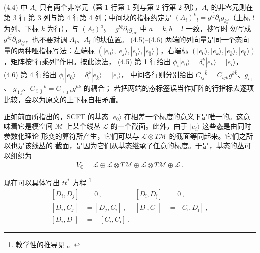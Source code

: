 \begin{yizhu}[易错点]
(4.4) 中 $A_i$ 只有两个非零元（第 1 行第 1 列与第 2 行第 2 列），$A_{\bar\imath}$ 的非零元则在第 3 行
第 3 列与第 4 行第 4 列；中间块的指标约定是 $(A_i)^k{}_l=g^{l\bar j}\partial_i g_{k\bar j}$（上标 $l$
为列、下标 $k$ 为行），与 $(A_i)^a{}_b=g^{b\bar c}\partial_i g_{a\bar c}$ 中 $a=k,b=l$ 一致，抄写时
勿写成 $g^{k\bar j}\partial_i g_{l\bar j}$，也不要对调 $A_i$、$A_{\bar\imath}$ 的块位置。
(4.5)--(4.6) 两端的列向量是同一个态向量的两种哑指标写法：左端标
$(|e_0\rangle,|e_j\rangle,|e_{\bar\jmath}\rangle,|e_{\bar 0}\rangle)$，右端标
$(|e_0\rangle,|e_k\rangle,|e_{\bar k}\rangle,|e_{\bar 0}\rangle)$，矩阵按“行乘列”作用。按此读法，
(4.5) 第 1 行给出 $\phi_i|e_0\rangle=\delta^k_i|e_k\rangle=|e_i\rangle$，(4.6) 第 4 行给出
$\phi_{\bar\imath}|e_{\bar 0}\rangle=\delta^{\bar k}_{\bar\imath}|e_{\bar k}\rangle=|e_{\bar\imath}\rangle$，
中间各行则分别给出 $C_{ij}{}^{\bar k}=C_{ijk}g^{k\bar k}$、$g_{i\bar\jmath}$、
$g_{\bar\imath j}$、$C_{\bar\imath\bar\jmath}{}^{k}=C_{\bar\imath\bar\jmath\bar k}g^{\bar k k}$ 的耦合；
若把两端的态标签误当作矩阵的行指标去逐项比较，会以为原文的上下标自相矛盾。
\end{yizhu}

正如前面所指出的，SCFT 的基态 $|e_0\rangle$ 在相差一个标度的意义下是唯一的。这意味着它是模空间
$\mathcal{M}$ 上某个线丛 $\mathcal{L}$ 的一个截面。此外，由于 $|e_i\rangle$ 这些态是由同时参数化理论
形变的算符所产生，它们可以与 $\mathcal{L}\otimes T\mathcal{M}$ 的截面等同起来。它们之所以也是该线丛的
截面，是因为它们从基态继承了任意的标度。于是，基态的丛可以组织为
\begin{equation}
  V_{\mathbb{C}}=\mathcal{L}\oplus\mathcal{L}\otimes T\mathcal{M}
  \oplus\overline{\mathcal{L}\otimes T\mathcal{M}}\oplus\overline{\mathcal{L}}\,.
  \tag{4.7}
  \label{eq:4.7}
\end{equation}

现在可以具体写出 $tt^*$ 方程 \cite{ref70}\footnote{教学性的推导见 \cite{ref9}。}
\begin{equation}
  \begin{aligned}
    [D_i,D_j]&=0\,, & [D_{\bar\imath},D_{\bar\jmath}]&=0\,,\\
    [D_i,C_j]&=[D_j,C_i]\,, & [D_{\bar\imath},C_{\bar\jmath}]&=[C_{\bar\imath},D_{\bar\jmath}]\,,\\
    [D_i,D_{\bar\imath}]&=-[C_i,C_{\bar\imath}]\,.
  \end{aligned}
  \tag{4.8}
  \label{eq:4.8}
\end{equation}

